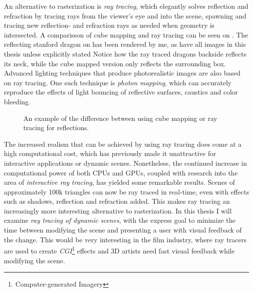 An alternative to rasterization is \textit{ray tracing}, which elegantly solves
reflection and refraction by tracing rays from the viewer's eye and into the
scene, spawning and tracing new reflection- and refraction rays as needed when
geometry is intersected. 
A comparisson of cube mapping and ray tracing can be seen on
. The reflecting stanford dragon on
 has been rendered by me, as have all images in
this thesis unless explicitly stated
Notice how the ray traced dragons backside reflects its neck, while the cube
mapped version only reflects the surrounding box. Advanced lighting techniques
that produce photorealistic images are also based on ray tracing. One such
technique is \textit{photon mapping}, which can accurately reproduce the effects
of light bouncing of reflective surfaces, caustics and color bleeding.

\begin{figure}
  \centering
  \hspace{10pt}
  \caption[Reflections created with cube mapping and ray tracing.]{An example of
    the difference between using cube mapping or ray tracing for
    reflections.}
  \label{fig:reflectingDragons}
\end{figure}



The increased realism that can be achieved by using ray tracing does come at a
high computational cost, which has previously made it unattractive for
interactive applications or dynamic scenes. Nonetheless, the continued increase
in computational power of both CPUs and GPUs, coupled with research into the
area of \textit{interactive ray tracing}, has yielded some remarkable results.
Scenes of approximately 100k triangles can now be ray traced in real-time, even
with effects such as shadows, reflection and refraction added. This makes ray
tracing an increasingly more interesting alternative to rasterization. In this
thesis I will examine \textit{ray tracing of dynamic scenes}, with the express
goal to minimize the time between modifying the scene and presenting a user with
visual feedback of the change. This would be very interesting in the film
industry, where ray tracers are used to create
\textit{CGI}\footnote{Computer-generated Imagery} effects and 3D artists need
fast visual feedback while modifying the scene.

